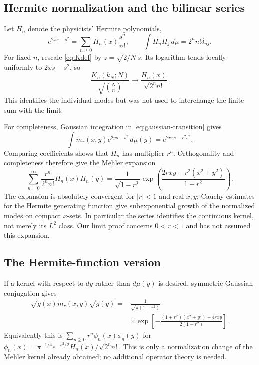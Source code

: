\documentclass[11pt,reqno]{amsart}
\theoremstyle{remark}\newtheorem{remark}[theorem]{Remark}
\begin{document}
\subsection{Hermite normalization and the bilinear series}
Let $H_n$ denote the physicists' Hermite polynomials,
\[
e^{2xs-s^2}=\sum_{n\ge0}H_n(x)\frac{s^n}{n!},\qquad
\int H_nH_j\,d\mu=2^nn!\delta_{nj}.
\]
For fixed $n$, rescale \eqref{eq:Kdef} by $z=\sqrt{2/N}\,s$.
Its logarithm tends locally uniformly to $2xs-s^2$, so
\begin{equation}\label{eq:fixed-degree}
\frac{K_n(k_N;N)}{\sqrt{\binom Nn}}
\longrightarrow\frac{H_n(x)}{\sqrt{2^nn!}}.
\end{equation}
This identifies the individual modes but was not used to interchange
the finite sum with the limit.

For completeness, Gaussian integration in \eqref{eq:gaussian-transition}
gives
\[
\int m_r(x,y)e^{2ys-s^2}\,d\mu(y)=e^{2rxs-r^2s^2}.
\]
Comparing coefficients shows that $H_n$ has multiplier $r^n$.
Orthogonality and completeness therefore give the Mehler expansion
\begin{equation}\label{eq:hermite-mehler}
\boxed{\displaystyle
\sum_{n=0}^{\infty}\frac{r^n}{2^nn!}H_n(x)H_n(y)
=\frac1{\sqrt{1-r^2}}
\exp\left(\frac{2rxy-r^2(x^2+y^2)}{1-r^2}\right).}
\end{equation}
The expansion is absolutely convergent for $|r|<1$ and real $x,y$;
Cauchy estimates for the Hermite generating function give subexponential
growth of the normalized modes on compact $x$-sets. In particular the
series identifies the continuous kernel, not merely its $L^2$ class.
Our limit proof concerns $0<r<1$ and has not assumed this expansion.

\subsection{The Hermite-function version}
If a kernel with respect to $dy$ rather than $d\mu(y)$ is desired,
symmetric Gaussian conjugation gives
\begin{equation}\label{eq:wavefunction-kernel}
\begin{aligned}
\sqrt{g(x)}m_r(x,y)\sqrt{g(y)}
={}&\frac1{\sqrt{\pi(1-r^2)}}\\
&\times\exp\left[-\frac{(1+r^2)(x^2+y^2)-4rxy}{2(1-r^2)}\right].
\end{aligned}
\end{equation}
Equivalently this is $\sum_{n\ge0}r^n\phi_n(x)\phi_n(y)$ for
$\phi_n(x)=\pi^{-1/4}e^{-x^2/2}H_n(x)/\sqrt{2^nn!}$.
This is only a normalization change of the Mehler kernel already
obtained; no additional operator theory is needed.
\end{document}
